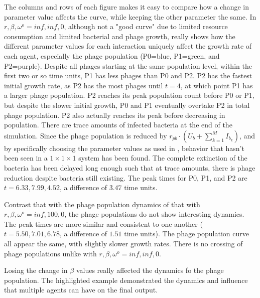 The columns and rows of each figure makes it easy to compare how a change in parameter value affects the curve, while keeping the other parameter the same. 
In $r, \beta, \omega^o=inf, inf, 0$, although not a "good curve" due to limited resource consumption and limited bacterial and phage growth, really shows how the different parameter values for each interaction uniquely affect the growth rate of each agent, especially the phage population (P0=blue, P1=green, and P2=purple). 
Despite all phages starting at the same population level, within the first two or so time units, P1 has less phages than P0 and P2. 
P2 has the fastest initial growth rate, as P2 has the most phages until $t=4$, at which point P1 has a larger phage population. 
P2 reaches its peak population count before P0 or P1, but despite the slower initial growth, P0 and P1 eventually overtake P2 in total phage population. 
P2 also actually reaches its peak before decreasing in population. 
There are trace amounts of infected bacteria at the end of the simulation. 
Since the phage population is reduced by $r_{pb}\cdot(U_b + \sum_{k=1}^M I_{b_k})$, and by specifically choosing the parameter values as used in , behavior that hasn't been seen in a $1\times 1\times 1$ system has been found. 
The complete extinction of the bacteria has been delayed long enough such that at trace amounts, there is phage reduction despite bacteria still existing. 
The peak times for P0, P1, and P2 are $t=6.33, 7.99, 4.52$, a difference of $3.47$ time units. 

Contrast that with the phage population dynamics of that with $r, \beta, \omega^o = inf, 100, 0$, the phage populations do not show interesting dynamics. 
The peak times are more similar and consistent to one another ($t=5.50, 7.01, 6.78$, a difference of $1.51$ time units). 
The phage population curve all appear the same, with slightly slower growth rates. 
There is no crossing of phage populations unlike with $r, \beta, \omega^o=inf, inf, 0$. 

Losing the change in $\beta$ values really affected the dynamics fo the phage population. 
The highlighted example demonstrated the dynamics and influence that multiple agents can have on the final output. 

